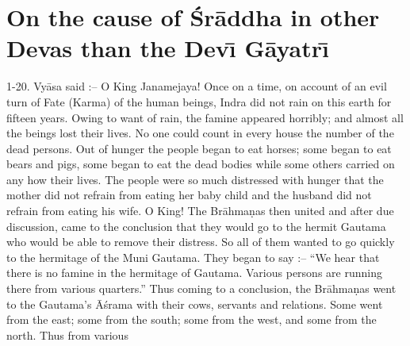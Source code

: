 \chapter{On the cause of \'Sr\=addha in other Devas than the Dev\={\i} G\=ayatr\={\i}}

1-20. Vy\=asa said :-- O King Janamejaya! Once on a time, on account of an evil turn of Fate (Karma) of the human beings, Indra did not rain on this earth for fifteen years. Owing to want of rain, the famine appeared horribly; and almost all the beings lost their lives. No one could count in every house the number of the dead persons. Out of hunger the people began to eat horses; some began to eat bears and pigs, some began to eat the dead bodies while some others carried on any how their lives. The people were so much distressed with hunger that the mother did not refrain from eating her baby child and the husband did not refrain from eating his wife. O King! The Br\=ahma\d{n}as then united and after due discussion, came to the conclusion that they would go to the hermit Gautama who would be able to remove their distress. So all of them wanted to go quickly to the hermitage of the Muni Gautama. They began to say :-- ``We hear that there is no famine in the hermitage of Gautama. Various persons are running there from various quarters.'' Thus coming to a conclusion, the Br\=ahma\d{n}as went to the Gautama's \=A\'srama with their cows, servants and relations. Some went from the east; some from the south; some from the west, and some from the north. Thus from various

